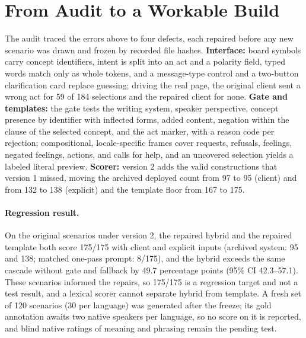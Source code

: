 \section{From Audit to a Workable Build}
\label{sec:repair}

The audit traced the errors above to four defects, each repaired before any new scenario was drawn and frozen by recorded file hashes.
\textbf{Interface:} board symbols carry concept identifiers, intent is split into an act and a polarity field, typed words match only as whole tokens, and a message-type control and a two-button clarification card replace guessing; driving the real page, the original client sent a wrong act for 59 of 184 selections and the repaired client for none.
\textbf{Gate and templates:} the gate tests the writing system, speaker perspective, concept presence by identifier with inflected forms, added content, negation within the clause of the selected concept, and the act marker, with a reason code per rejection; compositional, locale-specific frames cover requests, refusals, feelings, negated feelings, actions, and calls for help, and an uncovered selection yields a labeled literal preview.
\textbf{Scorer:} version 2 adds the valid constructions that version 1 missed, moving the archived deployed count from 97 to 95 (client) and from 132 to 138 (explicit) and the template floor from 167 to 175.

\paragraph{Regression result.}
On the original \NPrimAll{} scenarios under version 2, the repaired hybrid and the repaired template both score 175/175 with client and explicit inputs (archived system: 95 and 138; matched one-pass \qwen{} prompt: 8/175), and the hybrid exceeds the same cascade without gate and fallback by 49.7 percentage points (95\% CI 42.3--57.1).
These scenarios informed the repairs, so 175/175 is a regression target and not a test result, and a lexical scorer cannot separate hybrid from template.
A fresh set of 120 scenarios (30 per language) was generated after the freeze; its gold annotation awaits two native speakers per language, so no score on it is reported, and blind native ratings of meaning and phrasing remain the pending test.
